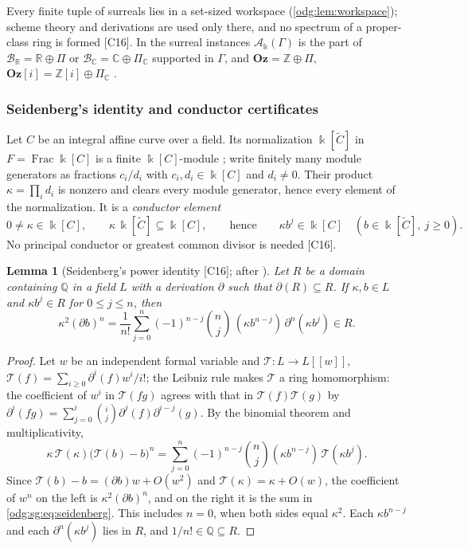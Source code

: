 \documentclass[11pt,oneside]{article}
\numberwithin{equation}{section}
\newtheorem{lemma}[lemma]{Lemma}
\theoremstyle{definition}
\theoremstyle{remark}
\newcommand{\Oz}{\mathbf{Oz}}
\newcommand{\Z}{\mathbb Z}
\newcommand{\Q}{\mathbb Q}
\newcommand{\R}{\mathbb R}
\newcommand{\C}{\mathbb C}
\newcommand{\BR}{\mathcal B_{\R}}
\newcommand{\BC}{\mathcal B_{\C}}
\newcommand{\Frac}{\operatorname{Frac}}
\newcommand{\src}[1]{\textup{\textsf{\small[#1]}}}
\newcommand{\Og}{\Oz[i]}
\newcommand{\crA}{\mathcal A_\Bbbk(\Gamma)}
\begin{document}
Every finite tuple of surreals lies in a set-sized workspace
(\cref{odg:lem:workspace}); scheme theory and derivations are used only there, and no
spectrum of a proper-class ring is formed \src{C16}. In the surreal instances
$\crA$ is the part of $\BR=\R\oplus\Pi$ or $\BC=\C\oplus\Pi_{\C}$ supported in $\Gamma$,
and $\Oz=\Z\oplus\Pi$, $\Og=\Z[i]\oplus\Pi_{\C}$ \cite{Conway,Gonshor,LM}.

\subsubsection{Seidenberg's identity and conductor certificates}\label{odg:sg:sub:seidenberg}

Let $C$ be an integral affine curve over a field. Its normalization
$\Bbbk[\widetilde C]$ in $F=\Frac\Bbbk[C]$ is a finite $\Bbbk[C]$-module
\cite{StacksFiniteNormal}; write finitely many module generators as fractions
$c_i/d_i$ with $c_i,d_i\in\Bbbk[C]$ and $d_i\ne0$. Their product
$\kappa=\prod_i d_i$ is nonzero and clears every module generator, hence
every element of the normalization. It is a \emph{conductor element}
\begin{equation}\label{odg:sg:eq:conductor}
 0\ne\kappa\in\Bbbk[C],\qquad \kappa\,\Bbbk[\widetilde C]\subseteq\Bbbk[C],
 \qquad\text{hence}\qquad \kappa b^j\in\Bbbk[C]\quad(b\in\Bbbk[\widetilde C],\ j\ge0).
\end{equation}
No principal conductor or greatest common divisor is needed \src{C16}.

\begin{lemma}[Seidenberg's power identity \src{C16}; after \cite{Seidenberg}]\label{odg:sg:lem:seidenberg}
Let $R$ be a domain containing $\Q$ in a field $L$ with a derivation $\partial$ such that
$\partial(R)\subseteq R$. If $\kappa,b\in L$ and $\kappa b^j\in R$ for $0\le j\le n$, then
\begin{equation}\label{odg:sg:eq:seidenberg}
 \kappa^2(\partial b)^n
 =\frac1{n!}\sum_{j=0}^n(-1)^{n-j}\binom nj\,(\kappa b^{n-j})\,\partial^n(\kappa b^j)\in R .
\end{equation}
\end{lemma}
\begin{proof}
Let $w$ be an independent formal variable and $\mathcal T:L\to L[[w]]$,
$\mathcal T(f)=\sum_{i\ge0}\partial^i(f)w^i/i!$; the Leibniz rule makes $\mathcal T$ a ring
homomorphism: the coefficient of $w^i$ in $\mathcal T(fg)$ agrees with
that in $\mathcal T(f)\mathcal T(g)$ by
$\partial^i(fg)=\sum_{j=0}^i\binom ij\partial^j(f)\partial^{i-j}(g)$.
By the binomial theorem and multiplicativity,
\[
 \kappa\,\mathcal T(\kappa)\bigl(\mathcal T(b)-b\bigr)^n
 =\sum_{j=0}^n(-1)^{n-j}\binom nj(\kappa b^{n-j})\,\mathcal T(\kappa b^j).
\]
Since $\mathcal T(b)-b=(\partial b)w+O(w^2)$ and $\mathcal T(\kappa)=\kappa+O(w)$, the
coefficient of $w^n$ on the left is $\kappa^2(\partial b)^n$, and on the right it is the
sum in \eqref{odg:sg:eq:seidenberg}. This includes $n=0$, when both
sides equal $\kappa^2$. Each $\kappa b^{n-j}$ and each
$\partial^n(\kappa b^j)$ lies in $R$, and $1/n!\in\Q\subseteq R$.
\end{proof}
\end{document}
